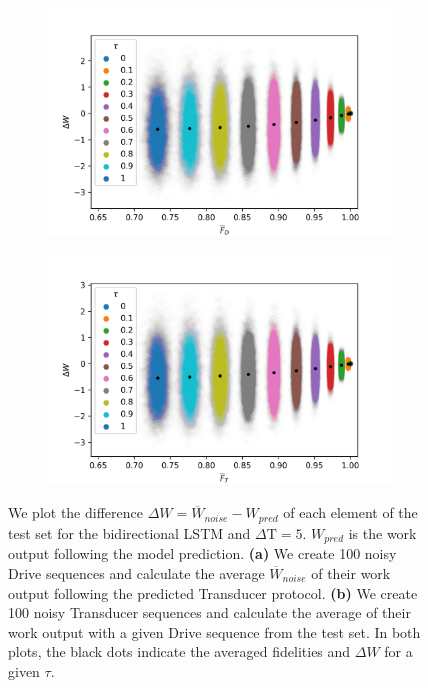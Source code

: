 \begin{figure}
	\centering
	\begin{subfigure}{0.4\textwidth}
		\centering
		\includegraphics[width=\textwidth]{img/noisy_drive_bi_true_3}
		\subcaption{}
	\end{subfigure}
	\begin{subfigure}{0.4\textwidth}
		\centering
		\includegraphics[width=\textwidth]{img/noisy_trans_bi_true_3}
		\subcaption{}
	\end{subfigure}
	\caption{We plot the difference $\Delta W = \overline{W}_{noise} - W_{pred}$ of each element of the test set for the bidirectional LSTM and $\Delta \mathrm{T} = 5$. $W_{pred}$ is the work output following the model prediction. \textbf{(a)} We create 100 noisy Drive sequences and calculate the average $\overline{W}_{noise}$ of their work output following the predicted Transducer protocol. \textbf{(b)} We create 100 noisy Transducer sequences and calculate the average of their work output with a given Drive sequence from the test set. In both plots, the black dots indicate the averaged fidelities and $\Delta W$ for a given $\tau$.}
	\label{noisedt5}
\end{figure}